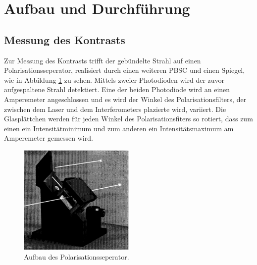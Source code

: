 \newpage
\section{Aufbau und Durchführung}
\label{sec:Durchführung}



\subsection{Messung des Kontrasts}
Zur Messung des Kontrasts trifft
der gebündelte Strahl auf einen Polarisationsseperator, realisiert durch einen
weiteren PBSC und einen Spiegel, wie in Abbildung \ref{fig:polsep} zu sehen.
Mittels zweier Photodioden wird der zuvor aufgespaltene Strahl detektiert.
Eine der beiden Photodiode wird an einen Amperemeter angeschlossen und
es wird der Winkel des Polarisationsfilters, der zwischen dem Laser und dem Interferometers plazierte wird, variiert.
Die Glasplättchen werden für jeden Winkel des Polarisationsfiters so rotiert, dass zum einen ein Intensitätminimum und zum anderen
ein Intensitätsmaximum am Amperemeter gemessen wird.


\begin{figure}
  \centering
  \includegraphics[width=0.5\textwidth]{PSBC.PNG}
  \caption{Aufbau des Polarisationsseperator.\cite{skript}}
  \label{fig:polsep}
\end{figure}
\FloatBarrier


